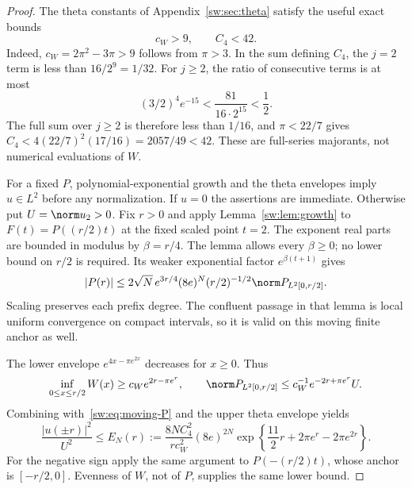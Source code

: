\documentclass[11pt,a4paper]{article}
\numberwithin{equation}{section}
\theoremstyle{definition}\newtheorem{definition}[theorem]{Definition}
\theoremstyle{remark}\newtheorem{remark}[theorem]{Remark}
\begin{document}
\begin{proof}
The theta constants of Appendix~\ref{sw:sec:theta} satisfy the useful exact bounds
\begin{equation}\label{sw:eq:theta-numeric-majorants}
 c_W>9,\qquad C_4<42.
\end{equation}
Indeed, $c_W=2\pi^2-3\pi>9$ follows from $\pi>3$. In the sum defining $C_4$, the $j=2$ term is less than $16/2^9=1/32$. For $j\ge2$, the ratio of consecutive terms is at most
\[
 (3/2)^4e^{-15}<\frac{81}{16\cdot2^{15}}<\frac12.
\]
The full sum over $j\ge2$ is therefore less than $1/16$, and $\pi<22/7$ gives
$C_4<4(22/7)^2(17/16)=2057/49<42$. These are full-series majorants, not numerical evaluations of $W$.

For a fixed $P$, polynomial-exponential growth and the theta envelopes imply $u\in L^2$ before any normalization. If $u=0$ the assertions are immediate. Otherwise put $U=\norm u_2>0$.
Fix $r>0$ and apply Lemma~\ref{sw:lem:growth} to $F(t)=P((r/2)t)$ at the fixed scaled point $t=2$. The exponent real parts are bounded in modulus by $\beta=r/4$. The lemma allows every $\beta\ge0$; no lower bound on $r/2$ is required. Its weaker exponential factor $e^{\beta(t+1)}$ gives
\begin{equation}\label{sw:eq:moving-P}
 |P(r)|\le2\sqrt N\,e^{3r/4}(8e)^N(r/2)^{-1/2}
                        \norm P_{L^2[0,r/2]}.
\end{equation}
Scaling preserves each prefix degree. The confluent passage in that lemma is local uniform convergence on compact intervals, so it is valid on this moving finite anchor as well.

The lower envelope $e^{4x-\pi e^{2x}}$ decreases for $x\ge0$. Thus
\[
 \inf_{0\le x\le r/2}W(x)\ge c_We^{2r-\pi e^r},\qquad
 \norm P_{L^2[0,r/2]}\le c_W^{-1}e^{-2r+\pi e^r}U.
\]
Combining with~\eqref{sw:eq:moving-P} and the upper theta envelope yields
\begin{equation}\label{sw:eq:moving-majorant}
 \frac{|u(\pm r)|^2}{U^2}\le
 E_N(r):=\frac{8NC_4^2}{rc_W^2}(8e)^{2N}
        \exp\left\{\frac{11}2r+2\pi e^r-2\pi e^{2r}\right\}.
\end{equation}
For the negative sign apply the same argument to $P(-(r/2)t)$, whose anchor is $[-r/2,0]$. Evenness of $W$, not of $P$, supplies the same lower bound.


\end{proof}
\end{document}
